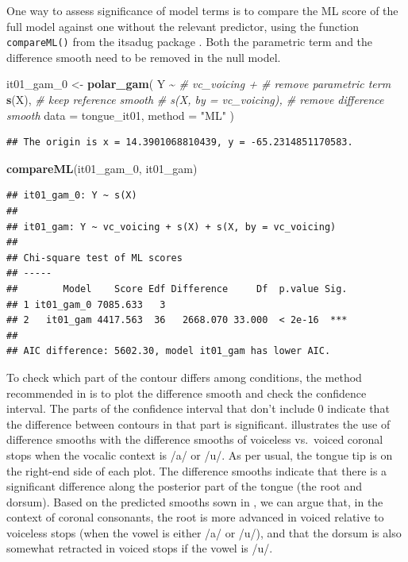 \documentclass[
  11pt,
]{article}
\newenvironment{Shaded}{\begin{snugshade}}{\end{snugshade}}
\newcommand{\CommentTok}[1]{\textcolor[rgb]{0.56,0.35,0.01}{\textit{#1}}}
\newcommand{\DataTypeTok}[1]{\textcolor[rgb]{0.13,0.29,0.53}{#1}}
\newcommand{\DecValTok}[1]{\textcolor[rgb]{0.00,0.00,0.81}{#1}}
\newcommand{\KeywordTok}[1]{\textcolor[rgb]{0.13,0.29,0.53}{\textbf{#1}}}
\newcommand{\NormalTok}[1]{#1}
\newcommand{\OperatorTok}[1]{\textcolor[rgb]{0.81,0.36,0.00}{\textbf{#1}}}
\newcommand{\StringTok}[1]{\textcolor[rgb]{0.31,0.60,0.02}{#1}}
\begin{document}
One way to assess significance of model terms is to compare the ML score
of the full model against one without the relevant predictor, using the
function \texttt{compareML()} from the itsadug package
\citep{van-rij2017}. Both the parametric term and the difference smooth
need to be removed in the null model.

\begin{Shaded}
\begin{Highlighting}[]
\NormalTok{it01\_gam\_}\DecValTok{0}\NormalTok{ \textless{}{-}}\StringTok{ }\KeywordTok{polar\_gam}\NormalTok{(}
\NormalTok{  Y }\OperatorTok{\textasciitilde{}}
\StringTok{    }\CommentTok{\# vc\_voicing +            \# remove parametric term}
\StringTok{    }\KeywordTok{s}\NormalTok{(X),                     }\CommentTok{\# keep reference smooth}
    \CommentTok{\# s(X, by = vc\_voicing),  \# remove difference smooth}
  \DataTypeTok{data =}\NormalTok{ tongue\_it01,}
  \DataTypeTok{method =} \StringTok{"ML"}
\NormalTok{)}
\end{Highlighting}
\end{Shaded}

\begin{verbatim}
## The origin is x = 14.3901068810439, y = -65.2314851170583.
\end{verbatim}

\begin{Shaded}
\begin{Highlighting}[]
\KeywordTok{compareML}\NormalTok{(it01\_gam\_}\DecValTok{0}\NormalTok{, it01\_gam)}
\end{Highlighting}
\end{Shaded}

\begin{verbatim}
## it01_gam_0: Y ~ s(X)
## 
## it01_gam: Y ~ vc_voicing + s(X) + s(X, by = vc_voicing)
## 
## Chi-square test of ML scores
## -----
##        Model    Score Edf Difference     Df  p.value Sig.
## 1 it01_gam_0 7085.633   3                                
## 2   it01_gam 4417.563  36   2668.070 33.000  < 2e-16  ***
## 
## AIC difference: 5602.30, model it01_gam has lower AIC.
\end{verbatim}

To check which part of the contour differs among conditions, the method
recommended in \citet{soskuthy2017} is to plot the difference smooth and
check the confidence interval. The parts of the confidence interval that
don't include 0 indicate that the difference between contours in that
part is significant.  illustrates the use of difference
smooths with the difference smooths of voiceless vs.~voiced coronal
stops when the vocalic context is /a/ or /u/. As per usual, the tongue
tip is on the right-end side of each plot. The difference smooths
indicate that there is a significant difference along the posterior part
of the tongue (the root and dorsum). Based on the predicted smooths sown
in , we can argue that, in the context of coronal
consonants, the root is more advanced in voiced relative to voiceless
stops (when the vowel is either /a/ or /u/), and that the dorsum is also
somewhat retracted in voiced stops if the vowel is /u/.
\end{document}
